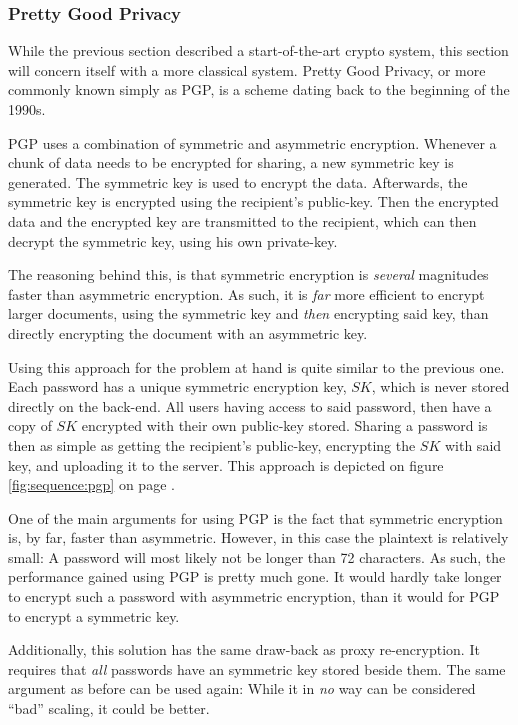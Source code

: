 			\subsubsection{Pretty Good Privacy}
				While the previous section described a start-of-the-art crypto system, this section will concern itself with a more classical system. Pretty Good Privacy, or more commonly known simply as PGP, is a scheme dating back to the beginning of the 1990s.

				PGP uses a combination of symmetric and asymmetric encryption. Whenever a chunk of data needs to be encrypted for sharing, a new symmetric key is generated. The symmetric key is used to encrypt the data. Afterwards, the symmetric key is encrypted using the recipient's public-key. Then the encrypted data and the encrypted key are transmitted to the recipient, which can then decrypt the symmetric key, using his own private-key. 

				The reasoning behind this, is that symmetric encryption is \emph{several} magnitudes faster than asymmetric encryption. As such, it is \emph{far} more efficient to encrypt larger documents, using the symmetric key and \emph{then} encrypting said key, than directly encrypting the document with an asymmetric key.

				Using this approach for the problem at hand is quite similar to the previous one. Each password has a unique symmetric encryption key, $SK$, which is never stored directly on the back-end. All users having access to said password, then have a copy of $SK$ encrypted with their own public-key stored. Sharing a password is then as simple as getting the recipient's public-key, encrypting the $SK$ with said key, and uploading it to the server. This approach is depicted on figure \ref{fig:sequence:pgp} on page \pageref{fig:sequence:pgp}.

				One of the main arguments for using PGP is the fact that symmetric encryption is, by far, faster than asymmetric. However, in this case the plaintext is relatively small: A password will most likely not be longer than 72 characters. As such, the performance gained using PGP is pretty much gone. It would hardly take longer to encrypt such a password with asymmetric encryption, than it would for PGP to encrypt a symmetric key.

				Additionally, this solution has the same draw-back as proxy re-encryption. It requires that \emph{all} passwords have an symmetric key stored beside them. The same argument as before can be used again: While it in \emph{no} way can be considered ``bad'' scaling, it could be better.

